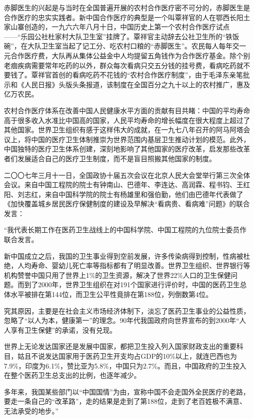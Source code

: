\begin{maonote}
赤脚医生的兴起是与当时在全国普遍开展的农村合作医疗密不可分的，赤脚医生是合作医疗的忠实实践者。新中国合作医疗的典型是一个叫覃祥官的人在鄂西长阳土家山寨创造的，一九六六年八月十日，中国历史上第一个农村合作医疗试点——“乐园公社杜家村大队卫生室”挂牌了。覃祥官主动辞去公社卫生所的“铁饭碗”，在大队卫生室当起了记工分、吃农村口粮的“赤脚医生”。农民每人每年交一元合作医疗费，大队再从集体公益金中人均提留五角钱作为合作医疗基金。除个别老痼疾病需要常年吃药的以外，群众每次看病只交五分钱的挂号费，看病吃药就不要钱了。覃祥官首创的看病吃药不花钱的“农村合作医疗制度”，由于毛泽东亲笔批示和《人民日报》头版头条报道，该制度在全国百分之九十以上的农村推广，惠及亿万农民。

农村合作医疗体系在改善中国人民健康水平方面的贡献有目共睹：中国的平均寿命高于很多收入水准比中国高的国家，人民平均寿命的增长幅度在很大程度上超过了其他国家。世界卫生组织有感于这样伟大的成就，在一九七八年召开的阿马阿塔会议上，将中国的医疗卫生体制推崇为世界范围内基层卫生推动计划的模范。此外，中国独特的医疗卫生体系创建，深刻地影响了其他国家的医疗改革，启发那些改革者们发展适合自己的医疗卫生制度，而不是盲目照搬其他国家的制度。

二〇〇七年三月十一日，全国政协十届五次会议在北京人民大会堂举行第三次全体会议。来自中国工程院的院士有钟南山、巴德年、李连达、高润霖、程书钧、王红阳、刘志红，来自中国科学院的院士有杨雄里和强伯勤，他们由巴德年代表做了《加快覆盖城乡居民医疗保健制度的建设及早解决“看病贵、看病难”问题》的联合发言：

“我代表长期工作在医药卫生战线上的中国科学院、中国工程院的九位院士委员作联合发言。

新中国成立之后，我国的卫生事业得到空前发展，许多传染病得到控制，性病被杜绝，人均寿命、婴幼儿死亡率等指标都有了明显改善。世界卫生组织、世界银行等机构赞誉中国只用了世界上1\%的卫生资源，解决了世界22\%人口的卫生保健问题。而到了2000年，世界卫生组织在对191个国家进行评价时，中国的医药卫生总体水平被排在第144位，而卫生公平性竟排在第188位，列倒数第4位。

究其原因，主要是在社会主义市场经济体制下，淡忘了医药卫生事业的公益性质，忽略了“以人为本，健康第一”的理念。90年代我国政府向世界宣布的到2000年“人人享有卫生保健”的承诺，没有兑现。

世界上无论发达国家还是发展中国家，都把卫生投入列入国家财政支出的重要科目，姑且不说发达国家用于医药卫生开支均占GDP的10\%以上，就连巴西也为7.9\%，印度为6.1\%，赞比亚为5.8\%，中国只为2.7\%。而且，中国政府的卫生投入在整个医药卫生总支出的比例，也逐年减少。

多年来，我国某些部门以“中国国情”为由，宣称中国不会走国外全民医疗的老路，要走一条自己的“改革路”，走的结果是走到了第188位，走到了老百姓极不满意、无法承受的地步。”
\end{maonote}
